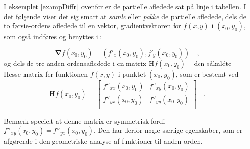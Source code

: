 I eksemplet \ref{exampDiffn} ovenfor er de partielle afledede sat på linje i tabellen. I det følgende vi\-ser det sig smart at {\textit{samle}} eller {\textit{pakke}}  de partielle afledede, dels de to første-ordens afledede til en vektor, gradientvektoren for $f(x,y)$ i $(x_{0}, y_{0})$, som også indføres og benyttes i :

\begin{equation}
\bm{\nabla}f(x_{0}, y_{0}) = (f'_{x}(x_{0}, y_{0}), f'_{y}(x_{0}, y_{0})) \quad ,
\end{equation}
og dels de tre anden-ordensafledede i en matrix $\mathbf{H}f(x_{0}, y_{0})$ -- den såkaldte Hesse-matrix for funktionen $f(x,y)$ i punktet $(x_{0}, y_{0})$, som er bestemt ved
\begin{equation}
\mathbf{H}f(x_{0}, y_{0}) = \left[
                              \begin{array}{cc}
                                f''_{xx}(x_{0}, y_{0}) & f''_{xy}(x_{0}, y_{0}) \\
                                f''_{yx}(x_{0}, y_{0}) & f''_{yy}(x_{0}, y_{0}) \\
                              \end{array}
                            \right] \quad .
\end{equation}

\begin{obs}
Bemærk specielt at denne matrix er symmetrisk fordi $f''_{xy}(x_{0}, y_{0}) = f''_{yx}(x_{0}, y_{0})$. Den har derfor nogle særlige egenskaber, som er afgørende i den geometriske analyse af funktioner til anden orden.
\end{obs}

